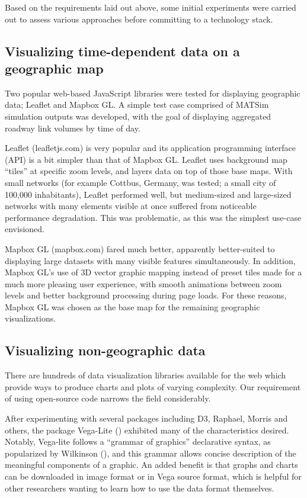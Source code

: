 Based on the requirements laid out above, some initial experiments were carried out to assess various approaches before committing to a technology stack.

\hypertarget{mathub-visualizing-time-dependent-data-on-a-geographic-map}{%
\subsection{Visualizing time-dependent data on a geographic
map}\label{visualizing-time-dependent-data-on-a-geographic-map}}

Two popular web-based JavaScript libraries were tested for displaying geographic data; Leaflet and Mapbox GL. A simple test case comprised of MATSim simulation outputs was developed, with the goal of displaying aggregated roadway link volumes by time of day.

Leaflet (leafletjs.com) is very popular and its application programming interface (API) is a bit simpler than that of Mapbox GL. Leaflet uses background map ``tiles'' at specific zoom levels, and layers data on top of those base maps. With small networks (for example Cottbus, Germany, was tested; a small city of 100,000 inhabitants), Leaflet performed well, but medium-sized and large-sized networks with many elements visible at once suffered from noticeable performance degradation. This was problematic, as this was the simplest use-case envisioned.

Mapbox GL (mapbox.com) fared much better, apparently better-suited to displaying large datasets with many visible features simultaneously. In addition, Mapbox GL's use of 3D vector graphic mapping instead of preset tiles made for a much more pleasing user experience, with smooth animations between zoom levels and better background processing during page loads. For these reasons, Mapbox GL was chosen as the base map for the remaining geographic visualizations.

\hypertarget{visualizing-non-geographic-data}{%
\subsection{Visualizing non-geographic data}\label{visualizing-non-geographic-data}}

There are hundreds of data visualization libraries available for the web which provide ways to produce charts and plots of varying complexity. Our requirement of using open-source code narrows the field considerably.

After experimenting with several packages including D3, Raphael, Morris and others, the package Vega-Lite (\cite{Satyanarayan2016vega}) exhibited many of the characteristics desired. Notably, Vega-lite follows a ``grammar of graphics'' declarative syntax, as popularized by Wilkinson (\cite{Wilkinson2012grammar}), and this grammar allows concise description of the meaningful components of a graphic. An added benefit is that graphs and charts can be downloaded in image format or in Vega source format, which is helpful for other researchers wanting to learn how to use the data format themselves.

